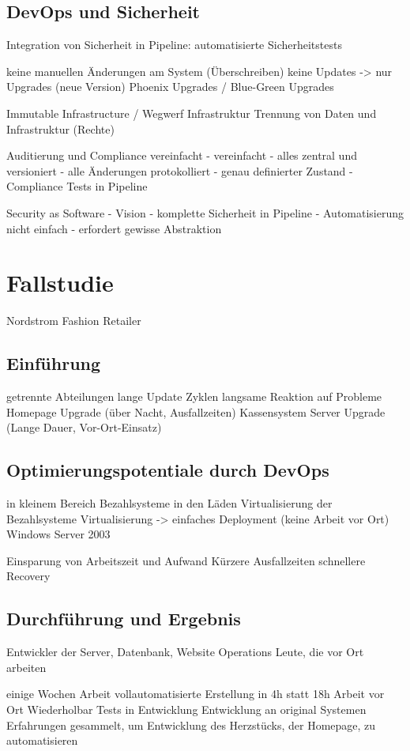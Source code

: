 \subsection{DevOps und Sicherheit}
Integration von Sicherheit in Pipeline: automatisierte Sicherheitstests

keine manuellen Änderungen am System (Überschreiben)
keine Updates -> nur Upgrades (neue Version)
Phoenix Upgrades / Blue-Green Upgrades

Immutable Infrastructure / Wegwerf Infrastruktur
Trennung von Daten und Infrastruktur (Rechte)

Auditierung und Compliance vereinfacht
- vereinfacht
- alles zentral und versioniert
- alle Änderungen protokolliert
- genau definierter Zustand
- Compliance Tests in Pipeline

Security as Software
- Vision
- komplette Sicherheit in Pipeline
- Automatisierung nicht einfach
- erfordert gewisse Abstraktion


\section{Fallstudie} %
Nordstrom Fashion Retailer

\subsection{Einführung}
getrennte Abteilungen
lange Update Zyklen
langsame Reaktion auf Probleme
Homepage Upgrade (über Nacht, Ausfallzeiten)
Kassensystem Server Upgrade (Lange Dauer, Vor-Ort-Einsatz)

\subsection{Optimierungspotentiale durch DevOps}
in kleinem Bereich
Bezahlsysteme in den Läden
Virtualisierung der Bezahlsysteme
Virtualisierung -> einfaches Deployment (keine Arbeit vor Ort)
Windows Server 2003

Einsparung von Arbeitszeit und Aufwand
Kürzere Ausfallzeiten
schnellere Recovery

\subsection{Durchführung und Ergebnis}
Entwickler der Server, Datenbank, Website
Operations Leute, die vor Ort arbeiten

einige Wochen Arbeit
vollautomatisierte Erstellung in 4h statt 18h Arbeit vor Ort
Wiederholbar
Tests in Entwicklung
Entwicklung an original Systemen
Erfahrungen gesammelt, um Entwicklung des Herzstücks, der Homepage, zu automatisieren
